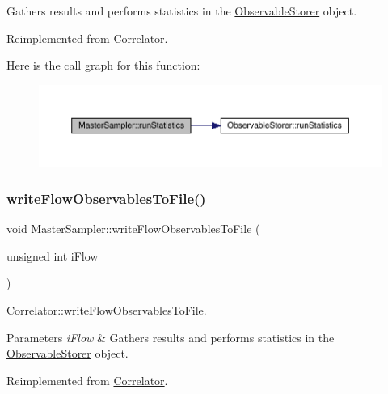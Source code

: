 Gathers results and performs statistics in the \mbox{\hyperlink{class_observable_storer}{Observable\+Storer}} object. 

Reimplemented from \mbox{\hyperlink{class_correlator_a35197b1d12b62ef30b79c0138a26456e}{Correlator}}.

Here is the call graph for this function\+:
\nopagebreak
\begin{figure}[H]
\begin{center}
\leavevmode
\includegraphics[width=350pt]{class_master_sampler_ab7913d0dbdea57af3f469a3cdd74f8fc_cgraph}
\end{center}
\end{figure}
\mbox{\label{class_master_sampler_ad475928217ac61fae134128904aaa9f8}} 
\subsubsection{\texorpdfstring{writeFlowObservablesToFile()}{writeFlowObservablesToFile()}}
{\footnotesize\ttfamily void Master\+Sampler\+::write\+Flow\+Observables\+To\+File (\begin{DoxyParamCaption}\item[{unsigned int}]{i\+Flow }\end{DoxyParamCaption})\hspace{0.3cm}{\ttfamily [virtual]}}



\mbox{\hyperlink{class_correlator_a168512b2ce182d9478db47f100125fa6}{Correlator\+::write\+Flow\+Observables\+To\+File}}. 


\begin{DoxyParams}{Parameters}
{\em i\+Flow} & Gathers results and performs statistics in the \mbox{\hyperlink{class_observable_storer}{Observable\+Storer}} object. \\
\hline
\end{DoxyParams}


Reimplemented from \mbox{\hyperlink{class_correlator_a168512b2ce182d9478db47f100125fa6}{Correlator}}.

